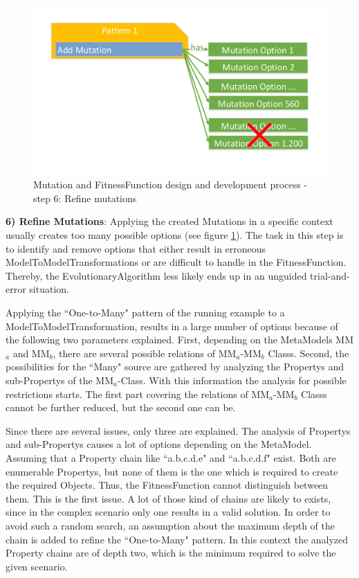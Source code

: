 \begin{figure}[!ht]
	\centering
	\includegraphics[scale=0.5, trim=0cm 1cm 0cm 1cm, clip=true]{Images/MutationAndFitnessFunctionDesignProcess-Step6.pdf} 
	\caption{\Gls{Mutation} and \gls{FitnessFunction} design and development process - step 6: Refine mutations}
	\label{figMutationAndFitnessFunctionDesignProcess-Step6}
\end{figure}

\textbf{6) Refine \glspl{Mutation}}: Applying the created \glspl{Mutation} in a specific context usually creates too many possible options (see figure \ref{figMutationAndFitnessFunctionDesignProcess-Step6}). The task in this step is to identify and remove options that either result in erroneous \glspl{ModelToModelTransformation} or are difficult to handle in the \gls{FitnessFunction}. Thereby, the \gls{EvolutionaryAlgorithm} less likely ends up in an unguided trial-and-error situation.

Applying the ``One-to-Many" pattern of the running example to a \gls{ModelToModelTransformation}, results in a large number of options because of the following two parameters explained. First, depending on the \glspl{MetaModel} MM$_a$ and MM$_b$, there are several possible relations of MM$_a$-MM$_b$ \glspl{Class}. Second, the possibilities for the ``Many" source are gathered by analyzing the \glspl{Property} and sub-\glspl{Property} of the MM$_a$-\gls{Class}. With this information the analysis for possible restrictions starts. The first part covering the relations of MM$_a$-MM$_b$ \glspl{Class} cannot be further reduced, but the second one can be.

Since there are several issues, only three are explained. The analysis of \glspl{Property} and sub-\glspl{Property} causes a lot of options depending on the \gls{MetaModel}. Assuming that a \gls{Property} chain like ``a.b.c.d.e" and ``a.b.c.d.f" exist. Both are enumerable \glspl{Property}, but none of them is the one which is required to create the required \glspl{Object}. Thus, the \gls{FitnessFunction} cannot distinguish between them. This is the first issue. A lot of those kind of chains are likely to exists, since in the complex scenario only one results in a valid solution. In order to avoid such a random search, an assumption about the maximum depth of the chain is added to refine the ``One-to-Many" pattern. In this context the analyzed \gls{Property} chains are of depth two, which is the minimum required to solve the given scenario.

